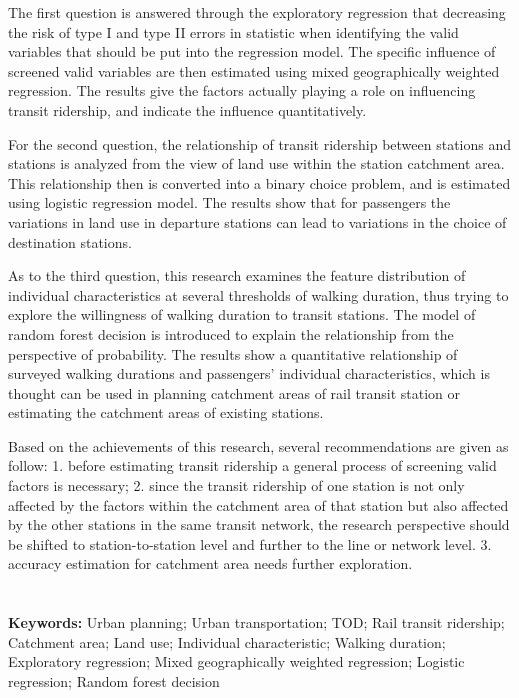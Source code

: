 \documentclass[12pt, twoside, a4paper]{book} %
\begin{document}
The first question is answered through the exploratory regression that decreasing the risk of type I and type II errors in statistic when identifying the valid variables that should be put into the regression model. The specific influence of screened valid variables are then estimated using mixed geographically weighted regression. The results give the factors actually playing a role on influencing transit ridership, and indicate the influence quantitatively. 

For the second question, the relationship of transit ridership between stations and stations is analyzed from the view of land use within the station catchment area. This relationship then is converted into a binary choice problem, and is estimated using logistic regression model. The results show that for passengers the variations in land use in departure stations can lead to variations in the choice of destination stations.

As to the third question, this research examines the feature distribution of individual characteristics at several thresholds of walking duration, thus trying to explore the willingness of walking duration to transit stations. The model of random forest decision is introduced to explain the relationship from the perspective of probability. The results show a quantitative relationship of surveyed walking durations and passengers' individual characteristics, which is thought can be used in planning catchment areas of rail transit station or estimating the catchment areas of existing stations.

Based on the achievements of this research, several recommendations are given as follow: 1. before estimating transit ridership a general process of screening valid factors is necessary; 2. since the transit ridership of one station is not only affected by the factors within the catchment area of that station but also affected by the other stations in the same transit network, the research perspective should be shifted to station-to-station level and further to the line or network level. 3. accuracy estimation for catchment area needs further exploration. \\ \\ \\

\noindent %
\textbf{Keywords:} Urban planning; Urban transportation; TOD; Rail transit ridership; Catchment area; Land use; Individual characteristic; Walking duration; Exploratory regression; Mixed geographically weighted regression; Logistic regression; Random forest decision
\end{document}
